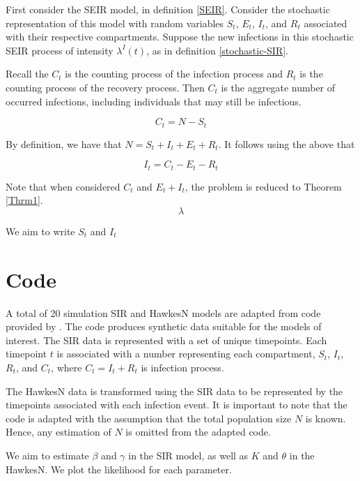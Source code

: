 \documentclass[12pt]{article}
\begin{document}
First consider the SEIR model, in definition \ref{SEIR}. Consider the stochastic representation of this  model with random variables $S_t$, $E_t$, $I_t$, and $R_t$ associated with their respective compartments. Suppose the new infections in this stochastic SEIR process of intensity $\lambda^I(t)$, as in definition \ref{stochastic-SIR}.

Recall the $C_t$ is the counting process of the infection process and $R_t$ is the counting process of the recovery process. Then $C_t$ is the aggregate number of occurred infections, including individuals that may still be infectious. 

$$
C_t = N - S_t
$$

By definition, we have that $N = S_t + I_t + E_t + R_t$. It follows using the above that

$$
I_t =  C_t - E_t - R_t
$$


Note that when considered $C_t$ and $E_t + I_t$, the problem is reduced to Theorem \ref{Thrm1}. 
$$
\lambda
$$



We aim to write $S_t$ and $I_t$

\section{Code}

A total of 20 simulation SIR and HawkesN models are adapted from code provided by \citep{Rizoiu2018}. The code produces synthetic data suitable for the models of interest. The SIR data is represented with a set of unique timepoints. Each timepoint $t$ is associated with a number representing each compartment, $S_t$, $I_t$, $R_t$, and $C_t$, where $C_t = I_t + R_t$ is infection process. 
 
The HawkesN data is transformed using the SIR data to be represented by the timepoints associated with each infection event. It is important to note that the code is adapted with the assumption that the total population size $N$ is known. Hence, any estimation of $N$ is omitted from the adapted code. 

We aim to estimate $\beta$ and $\gamma$ in the SIR model, as well as $K$ and $\theta$ in the HawkesN. We plot the likelihood for each parameter. 
\end{document}
